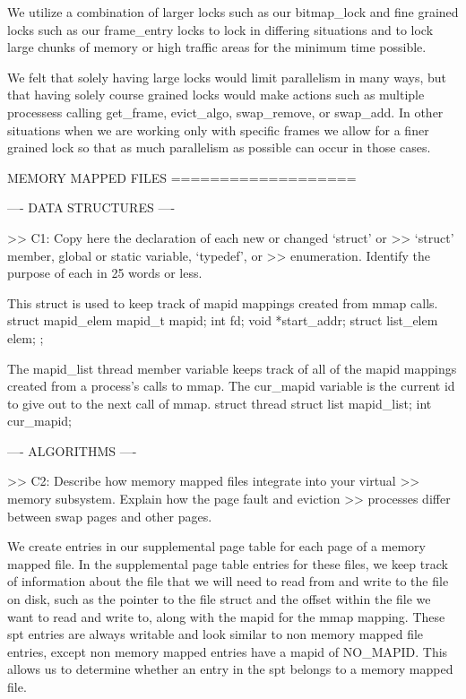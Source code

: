 We utilize a combination of larger locks such as our bitmap_lock and
fine grained locks such as our frame_entry locks to lock in differing
situations and to lock large chunks of memory or high traffic areas 
for the minimum time possible. 

We felt that solely having large locks would limit parallelism in many ways, 
but that having solely course grained locks would make actions such as multiple
processess calling get_frame, evict_algo, swap_remove, or swap_add. In other
situations when we are working only with specific frames we allow for a finer
grained lock so that as much parallelism as possible can occur in those cases.

             MEMORY MAPPED FILES
             ===================

---- DATA STRUCTURES ----

>> C1: Copy here the declaration of each new or changed `struct' or
>> `struct' member, global or static variable, `typedef', or
>> enumeration.  Identify the purpose of each in 25 words or less.

This struct is used to keep track of mapid mappings created from mmap calls.
    struct mapid_elem
    {
        mapid_t mapid;
        int fd;
        void *start_addr;
        struct list_elem elem;
    };

The mapid_list thread member variable keeps track of all of the mapid mappings
created from a process's calls to mmap. The cur_mapid variable is the current
id to give out to the next call of mmap.
    struct thread
    {
       struct list mapid_list; 
       int cur_mapid; 
    }

---- ALGORITHMS ----

>> C2: Describe how memory mapped files integrate into your virtual
>> memory subsystem.  Explain how the page fault and eviction
>> processes differ between swap pages and other pages.

We create entries in our supplemental page table for each page of a memory
mapped file. In the supplemental page table entries for these files,
we keep track of information about the file that we will need to
read from and write to the file on disk, such as the pointer to the file
struct and the offset within the file we want to read and write to, along
with the mapid for the mmap mapping. These spt entries are always writable
and look similar to non memory mapped file entries, except non memory mapped
entries have a mapid of NO_MAPID. This allows us to determine whether an 
entry in the spt belongs to a memory mapped file.

